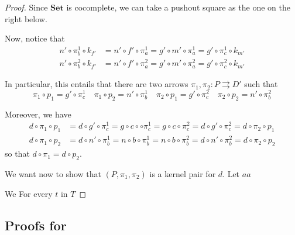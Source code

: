 \documentclass[a4paper,UKenglish,cleveref,pdftex,thm-restate,numberwithinsect]{lipics-v2021}
\newcommand{\Set}{\mathbf{Set}}
\begin{document}
\begin{proof}
	Since $\Set$ is cocomplete, we can take a pushout square as the one  on the right below. 
	
	\parbox{10.5cm}{Now, notice that \begin{align*}
		n'\circ \pi^1_{b}\circ k_{f'}&=n'\circ f'\circ \pi^1_{a}=g'\circ m'\circ \pi^1_{a}=g'\circ \pi^{1}_{c}\circ k_{m'}\\
		n'\circ \pi^2_{b}\circ k_{f'}&=n'\circ f'\circ \pi^2_{a}=g'\circ m'\circ \pi^2_{a}=g'\circ \pi^{2}_{c}\circ k_{m'}
		\end{align*}}\hfill \parbox{2cm}{}
	
	In particular, this entails that there are two arrows $\pi_1, \pi_2\colon P\rightrightarrows D'$ such that 
	\[\pi_1\circ p_1=g'\circ \pi^1_c \quad \pi_1\circ p_2=n'\circ \pi^1_b \quad \pi_2\circ p_1=g'\circ \pi^2_c \quad \pi_2\circ p_2=n'\circ \pi^2_b\]
 
 Moreover,  we have
 \begin{align*}
 	d\circ \pi_1\circ p_1&=d\circ g'\circ \pi^1_c=g\circ c\circ \circ \pi^1_c=g\circ c\circ \pi^2_c=d\circ g'\circ \pi^2_c=d\circ \pi_2 \circ p_1\\
 	d\circ \pi_1\circ p_2&=d\circ n'\circ \pi^1_b=n\circ b \circ \pi^1_b=n\circ b\circ \pi^2_b=d\circ n'\circ \pi^2_b=d\circ \pi_2 \circ p_2
 \end{align*}
	so that $d\circ \pi_1=d\circ p_2$.
	
	We want now to show that $(P, \pi_1, \pi_2)$ is a kernel pair for $d$. Let $aa$


We 
For every $t$ in $T$
	
	
\end{proof}


\subsection{Proofs for }\label{app:due}
\fhyp*
\end{document}
